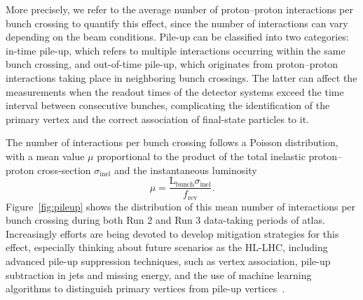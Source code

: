 More precisely, we refer to the average number of proton--proton interactions per bunch crossing to quantify this effect, since the number of interactions can vary depending on the beam conditions. Pile-up can be classified into two categories: in-time pile-up, which refers to multiple interactions occurring within the same bunch crossing, and out-of-time pile-up, which originates from proton--proton interactions taking place in neighboring bunch crossings. The latter can affect the measurements when the readout times of the detector systems exceed the time interval between consecutive bunches, complicating the identification of the primary vertex and the correct association of final-state particles to it.

The number of interactions per bunch crossing follows a Poisson distribution, with a mean value $\mu$ proportional to the product of the total inelastic proton--proton cross-section $\sigma_{\text{inel}}$ and the instantaneous luminosity~\cite{pileup}
\begin{equation}
    \mu = \frac{\text{L}_{\text{bunch}}\sigma_{\text{inel}}}{f_{\text{rev}}}.
\end{equation}
Figure~\ref{fig:pileup} shows the distribution of this mean number of interactions per bunch crossing during both Run 2 and Run 3 data-taking periods of \acrshort{atlas}.
Increasingly efforts are being devoted to develop mitigation strategies for this effect, especially thinking about future scenarios as the HL-LHC, including advanced pile-up suppression techniques, such as vertex association, pile-up subtraction in jets and missing energy, and the use of machine learning algorithms to distinguish primary vertices from pile-up vertices~\cite{ATL-PHYS-PUB-2023-011,ATLAS:2017pfq,Soyez_2019}.
